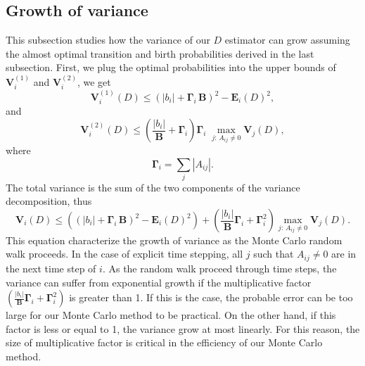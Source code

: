 \documentclass{elsart}
\theoremstyle{remark}
\theoremstyle{definition}
\theoremstyle{proof}
\begin{document}
    \subsection{Growth of variance}
        This subsection studies how the variance of our $D$ estimator can
        grow assuming the almost optimal transition and birth probabilities
        derived in the last subsection.  First, we plug the optimal
        probabilities into the upper bounds of $\mathbf{V}_i^{(1)}$ and
        $\mathbf{V}_i^{(2)}$, we get
        \[ \mathbf{V}_i^{(1)}(D)
            \le \left(|b_i| + \mathbf{\Gamma}_i\, \mathbf{B} \right)^2
                - \mathbf{E}_i(D)^2,
        \]
        and
        \[ \mathbf{V}_i^{(2)}(D)
            \le \left( \frac{|b_i|}{\mathbf{B}} + \mathbf{\Gamma}_i \right)
                \mathbf{\Gamma}_i\; \max_{j:\,A_{ij}\ne0} \mathbf{V}_j(D),
        \]
        where
        \[ \mathbf{\Gamma}_i = \sum_j |A_{ij}|.
        \]
        The total variance is the sum of the two components of the variance
        decomposition, thus
        \begin{equation} \label{vargrowth}
            \mathbf{V}_i(D)
            \le \left((|b_i| + \mathbf{\Gamma}_i\, \mathbf{B} )^2
                - \mathbf{E}_i(D)^2\right)
              + \left( \frac{|b_i|}
                {\mathbf{B}} \mathbf{\Gamma}_i + \mathbf{\Gamma}_i^2 \right)
                \max_{j:\,A_{ij}\ne0} \mathbf{V}_j(D).
        \end{equation}
        This equation characterize the growth of variance as the Monte Carlo
        random walk proceeds.  In the case of explicit time stepping, all
        $j$ such that $A_{ij}\ne 0$ are in the next time step of $i$.  As
        the random walk proceed through time steps, the variance can suffer
        from exponential growth if the multiplicative factor
        $\left( \frac{|b_i|} {\mathbf{B}} \mathbf{\Gamma}_i
        + \mathbf{\Gamma}_i^2 \right)$ is greater than 1.  If this is the
        case, the probable error can be too large for our Monte Carlo method
        to be practical.  On the other hand, if this factor is less or equal
        to 1, the variance grow at most linearly.  For this reason, the size
        of multiplicative factor is critical in the efficiency of our Monte
        Carlo method.
\end{document}
